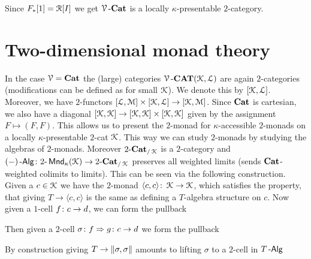 \documentclass[a4paper,11pt,oneside,openany]{scrbook}
\begin{document}
\begin{rmk}
	Since $F_{\ast}[1] = \Rf[I]$ we get $\V\text{-}\Cat$ is a locally $\kappa$-presentable $2$-category.
\end{rmk}

\section{Two-dimensional monad theory}

In the case $\V=\Cat$ the (large) categories $\V\text{-}\CAT(\K,\Lf)$ are again $2$-categories (modifications can be defined as for small $\K$). We denote
this by $[\K,\Lf]$. Moreover, we have $2$-functors $[\Lf,\M] \times [\K,\Lf] \to [\K,\M]$. Since $\Cat$ is cartesian, we also have a diagonal
$[\K,\K] \to [\K,\K] \times [\K,\K]$ given by the assignment $F \mapsto (F,F)$. This allows us to present the $2$-monad for $\kappa$-accessible $2$-monads on
a locally $\kappa$-presentable $2$-cat $\K$. This way we can study $2$-monads by studying the algebras of $2$-monads. Moreover $2\text{-}\Cat_{/\K}$ is
a $2$-category and $(-)\Alg \from 2\text{-}\Mnd_{\kappa}(\K) \to 2\text{-}\Cat_{/\K}$ preserves all weighted limits (sends $\Cat$-weighted colimits to limits).
This can be seen via the following construction. Given a $c \in \K$ we have the $2$-monad $\langle c,c \rangle \from \K \to \K$, which satisfies the property, that
giving $T \to \langle c,c \rangle$ is the same as defining a $T$-algebra structure on $c$. Now given a $1$-cell $f \from c \to d$, we can form the pullback
\begin{center}
\end{center}
Then given a $2$-cell $\sigma \from f \Rightarrow g \from c \to d$ we form the pullback
\begin{center}
\end{center}
By construction giving $T \to \Arrowvert \sigma,\sigma \Arrowvert$ amounts to lifting $\sigma$ to a $2$-cell in $T\Alg$
\begin{center}
\end{center}
\end{document}
